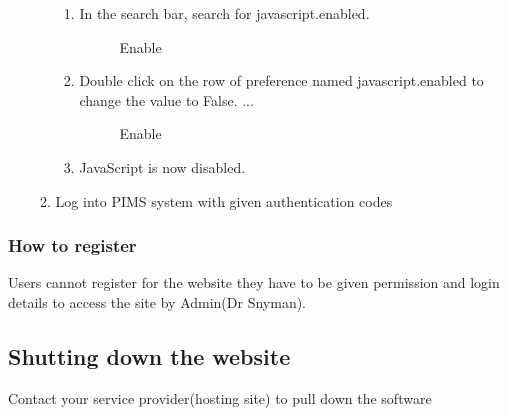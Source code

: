 \documentclass[14pt, a4paper]{article}
\begin{document}
\begin{enumerate}
\begin{enumerate}
\begin{enumerate}
       \item In the search bar, search for javascript.enabled.
     \begin{figure}[H]
       \centerline{}
		\caption{Enable}
      \end{figure}         
       
       \item Double click on the row of preference named javascript.enabled to change the value to False. ...
       \begin{figure}[H]
       \centerline{}
		\caption{Enable}
      \end{figure}   
      
       \item JavaScript is now disabled.
     \end{enumerate}

    \item Log into PIMS system with given authentication codes
  \end{enumerate}
 
\end{enumerate}


\subsubsection{How to register}
Users cannot register for the website they have to be given permission and login details to access the site by Admin(Dr Snyman).

\subsection{Shutting down the website}
Contact your service provider(hosting site) to pull down the software
\newpage
\end{document}
